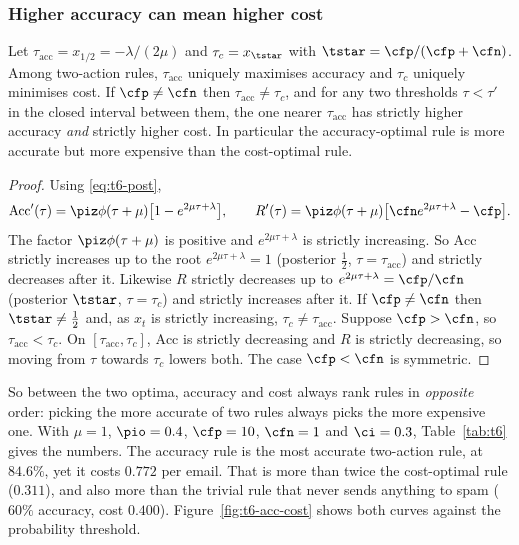 \subsubsection*{Higher accuracy can mean higher cost}

\begin{proposition}\label{prop:acc-cost}
Let $\tau_{\mathrm{acc}} = x_{1/2} = -\lambda/(2\mu)$ and $\tau_{c} = x_{\tstar}$ with
$\tstar = \cfp/(\cfp+\cfn)$. Among two-action rules, $\tau_{\mathrm{acc}}$ uniquely maximises
accuracy and $\tau_c$ uniquely minimises cost. If $\cfp\neq\cfn$ then $\tau_{\mathrm{acc}}\neq\tau_c$,
and for any two thresholds $\tau<\tau'$ in the closed interval between them, the one nearer
$\tau_{\mathrm{acc}}$ has strictly higher accuracy \emph{and} strictly higher cost. In particular the
accuracy-optimal rule is more accurate but more expensive than the cost-optimal rule.
\end{proposition}

\begin{proof}
Using \eqref{eq:t6-post},
\[
  \mathrm{Acc}'(\tau) = \piz\phi(\tau+\mu)\big[1 - e^{2\mu\tau+\lambda}\big], \qquad
  R'(\tau) = \piz\phi(\tau+\mu)\big[\cfn e^{2\mu\tau+\lambda} - \cfp\big].
\]
The factor $\piz\phi(\tau+\mu)$ is positive and $e^{2\mu\tau+\lambda}$ is strictly increasing. So
$\mathrm{Acc}$ strictly increases up to the root $e^{2\mu\tau+\lambda}=1$ (posterior $\tfrac12$,
$\tau=\tau_{\mathrm{acc}}$) and strictly decreases after it. Likewise $R$ strictly decreases up to
$e^{2\mu\tau+\lambda}=\cfp/\cfn$ (posterior $\tstar$, $\tau=\tau_c$) and strictly increases after it.
If $\cfp\ne\cfn$ then $\tstar\ne\tfrac12$ and, as $x_t$ is strictly increasing, $\tau_c\ne\tau_{\mathrm{acc}}$.
Suppose $\cfp>\cfn$, so $\tau_{\mathrm{acc}}<\tau_c$. On $[\tau_{\mathrm{acc}},\tau_c]$, $\mathrm{Acc}$ is
strictly decreasing and $R$ is strictly decreasing, so moving from $\tau$ towards $\tau_c$ lowers both.
The case $\cfp<\cfn$ is symmetric.
\end{proof}

So between the two optima, accuracy and cost always rank rules in \emph{opposite} order: picking
the more accurate of two rules always picks the more expensive one. With $\mu=1$, $\pio=0.4$,
$\cfp=10$, $\cfn=1$ and $\ci=0.3$, Table~\ref{tab:t6} gives the numbers. The accuracy rule is the
most accurate two-action rule, at $84.6\%$, yet it costs $0.772$ per email. That is more than twice the
cost-optimal rule ($0.311$), and also more than the trivial rule that never sends anything to spam
($60\%$ accuracy, cost $0.400$). Figure~\ref{fig:t6-acc-cost} shows both curves against the
probability threshold.

